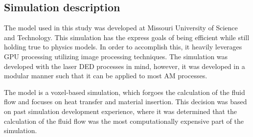 \documentclass[pdflatex,sn-mathphys]{sn-jnl}
\begin{document}
	\subsection{Simulation description} \label{model_description}

	The model used in this study was developed at Missouri University of Science and Technology.
	This simulation has the express goals of being efficient while still holding true to physics models.  In order to accomplish this, it heavily leverages GPU processing utilizing image processing techniques.  The simulation was developed with the laser \ac{DED} processes in mind, however, it was developed in a modular manner such that it can be applied to most \ac{AM} processes. 
	
	The model is a voxel-based simulation, which forgoes the calculation of the fluid flow and focuses on heat transfer and material insertion.  This decision was based on past simulation development experience, where it was determined that the calculation of the fluid flow was the most computationally expensive part of the simulation.   
	
\end{document}
